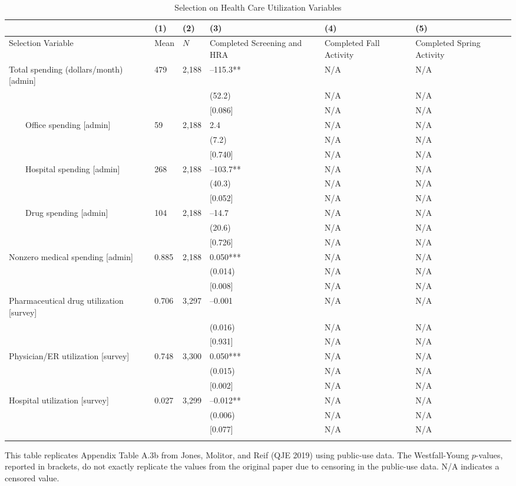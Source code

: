 \documentclass{article}
\begin{document}
\begin{table}[tbp] \centering
{}

\caption{Selection on Health Care Utilization Variables}
{\scriptsize
\begin{tabularx}{\linewidth}{lCCCCC}

\toprule
&{(1)}&{(2)}&{(3)}&{(4)}&{(5)} \tabularnewline \midrule
{Selection Variable}&{Mean}&{\(N\)}&{Completed Screening and HRA}&{Completed Fall Activity}&{Completed Spring Activity} \tabularnewline
\midrule \addlinespace[\belowrulesep]
Total spending (dollars/month) [admin]&479&2,188&--115.3**&N/A&N/A \tabularnewline
&&&(52.2)&N/A&N/A \tabularnewline
&&&[0.086]&N/A&N/A \tabularnewline
\ \ \ \ Office spending [admin]&59&2,188&2.4&N/A&N/A \tabularnewline
&&&(7.2)&N/A&N/A \tabularnewline
&&&[0.740]&N/A&N/A \tabularnewline
\ \ \ \ Hospital spending [admin]&268&2,188&--103.7**&N/A&N/A \tabularnewline
&&&(40.3)&N/A&N/A \tabularnewline
&&&[0.052]&N/A&N/A \tabularnewline
\ \ \ \ Drug spending [admin]&104&2,188&--14.7&N/A&N/A \tabularnewline
&&&(20.6)&N/A&N/A \tabularnewline
&&&[0.726]&N/A&N/A \tabularnewline
Nonzero medical spending [admin]&0.885&2,188&0.050***&N/A&N/A \tabularnewline
&&&(0.014)&N/A&N/A \tabularnewline
&&&[0.008]&N/A&N/A \tabularnewline
Pharmaceutical drug utilization [survey]&0.706&3,297&--0.001&N/A&N/A \tabularnewline
&&&(0.016)&N/A&N/A \tabularnewline
&&&[0.931]&N/A&N/A \tabularnewline
Physician/ER utilization [survey]&0.748&3,300&0.050***&N/A&N/A \tabularnewline
&&&(0.015)&N/A&N/A \tabularnewline
&&&[0.002]&N/A&N/A \tabularnewline
Hospital utilization [survey]&0.027&3,299&--0.012**&N/A&N/A \tabularnewline
&&&(0.006)&N/A&N/A \tabularnewline
&&&[0.077]&N/A&N/A \tabularnewline
\bottomrule \addlinespace[\belowrulesep]

\end{tabularx}
\begin{flushleft}
\footnotesize This table replicates Appendix Table A.3b from Jones, Molitor, and Reif (QJE 2019) using public-use data. The Westfall-Young \(p\)-values, reported in brackets, do not exactly replicate the values from the original paper due to censoring in the public-use data. N/A indicates a censored value.
\end{flushleft}
}
\end{table}
\end{document}
